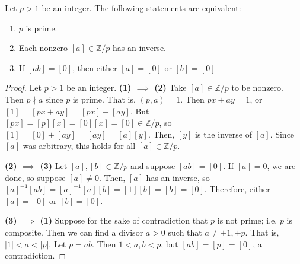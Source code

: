 \documentclass [12pt] {article}
\newcommand{\Z}{\mathbb{Z}}
\newenvironment{theorem}[1]{\begin{tcolorbox}[title={Theorem #1},colback=green!5!white,colframe=black!75!green]}{\end{tcolorbox}}
\renewcommand{\bf}[1]{\textbf{{#1}}}
\begin{document}
\begin{theorem}{}
    Let $p > 1$ be an integer. The following statements are equivalent:
    \begin{enumerate}[label=(\arabic*)]
        \item $p$ is prime.
        \item Each nonzero $[a] \in \Z/p$ has an inverse.
        \item If $[ab] = [0]$, then either $[a] = [0]$ or $[b] = [0]$
    \end{enumerate}
\end{theorem}
\begin{proof}
    Let $p > 1$ be an integer.
    \newline
    \bf{(1) $\bm{\implies}$ (2)}
    Take $[a] \in \Z/p$ to be nonzero. Then $p \nmid a$ since $p$ is prime. That is, $(p, a) = 1$.
    Then $px + ay = 1$, or
    $[1] = [px + ay]  = [px] + [ay]$. But $[px] = [p][x] = [0][x] = [0] \in \Z/p$, so
    $[1] = [0] + [ay] = [ay] = [a][y]$. Then, $[y]$ is the inverse of $[a]$. Since $[a]$ was
    arbitrary, this holds for all $[a] \in \Z/p$.
    \vspace{0.5em}

    \bf{(2) $\bm{\implies}$ (3)}
    Let $[a], [b] \in \Z/p$ and suppose $[ab] = [0]$. If $[a] = 0$, we are done, so suppose
    $[a] \neq 0$. Then, $[a]$ has an inverse, so
    $[a]^{-1} [ab] = [a]^{-1}[a] [b] = [1][b] = [b] = [0]$. Therefore, either $[a] = [0]$ or
    $[b] = [0]$.
    \vspace{0.5em}

    \bf{(3) $\bm{\implies}$ (1)}
    Suppose for the sake of contradiction that $p$ is not prime; i.e. $p$ is composite. Then we can
    find a divisor $a > 0$ such that $a \neq \pm 1, \pm p$. That is, $|1| < a < |p|$. Let $p = ab$.
    Then $1 < a, b < p$, but $[ab] = [p] = [0]$, a contradiction.
\end{proof}
\end{document}
